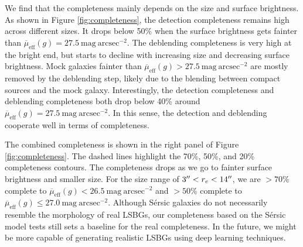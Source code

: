\documentclass[twocolumn,astrosymb,twocolappendix,linenumbers]{aastex631}
\newcommand{\sbunit}{\mathrm{mag\ arcsec}^{-2}}
\newcommand{\sbeff}{\overline{\mu}_{\mathrm{eff}}(g)}
\newcommand{\sersic}{S\'ersic}
\begin{document}
\begin{CJK*}{UTF8}{gbsn}
We find that the completeness mainly depends on the size and surface brightness. As shown in Figure \ref{fig:completeness}, the detection completeness remains high across different sizes. It drops below 50\% when the surface brightness gets fainter than $\sbeff = 27.5\ \sbunit$. The deblending completeness is very high at the bright end, but starts to decline with increasing size and decreasing surface brightness. Mock galaxies fainter than $\sbeff > 27.5\ \sbunit$ are mostly removed by the deblending step, likely due to the blending between compact sources and the mock galaxy. Interestingly, the detection completeness and deblending completeness both drop below 40\% around $\sbeff=27.5\ \sbunit$. In this sense, the detection and deblending cooperate well in terms of completeness. 

The combined completeness is shown in the right panel of Figure \ref{fig:completeness}. The dashed lines highlight the 70\%, 50\%, and 20\% completeness contours. The completeness drops as we go to fainter surface brightness and smaller size. For the size range of $3\mbox{$^{\prime\prime}$} < r_e < 14\mbox{$^{\prime\prime}$}$, we are $>70\%$ complete to $\sbeff < 26.5\ \sbunit$ and $>50\%$ complete to $\sbeff \leqslant 27.0\ \sbunit$. Although \sersic{} galaxies do not necessarily resemble the morphology of real LSBGs, our completeness based on the \sersic{} model tests still sets a baseline for the real completeness. In the future, we might be more capable of generating realistic LSBGs using deep learning techniques.


\end{CJK*}
\end{document}

